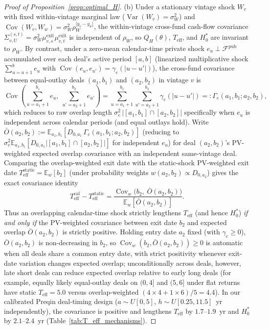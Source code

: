 \begin{proof}[Proof of Proposition~\ref{prop:optimal_H}]
(b) Under a stationary vintage shock $W_v$ with fixed within-vintage marginal law ($\operatorname{Var}(W_v) = \sigma_W^2$) and $\operatorname{Cov}(W_v, W_w) = \sigma_W^2 \rho_W^{|y_v-y_w|}$, the within-vintage cross-fund cash-flow covariance $\Sigma_{v,U}^{(s,t)} = \sigma_W^2 \mu_{v,s}^{\mathrm{exit}}\mu_{v,t}^{\mathrm{exit}}$ is independent of $\rho_W$, so $Q_H(\theta)$, $T_{\mathrm{eff}}$, and $H_0^\ast$ are invariant to $\rho_W$.
By contrast, under a zero-mean calendar-time private shock $e_u \perp \mathcal{F}^{\mathrm{pub}}$ accumulated over each deal's active period $[a,b]$ (linearized multiplicative shock $\sum_{u=a+1}^b e_u$ with $\operatorname{Cov}(e_u,e_{u'}) = \gamma_e(|u-u'|)$), the cross-fund covariance between equal-outlay deals $(a_1,b_1)$ and $(a_2,b_2)$ in vintage $v$ is
\[
\operatorname{Cov}\!\left(\sum_{u=a_1+1}^{b_1} e_u,\;\sum_{u'=a_2+1}^{b_2} e_{u'}\right)
= \sum_{u=a_1+1}^{b_1}\sum_{u'=a_2+1}^{b_2} \gamma_e(|u-u'|) =: \Gamma_e(a_1,b_1; a_2,b_2),
\]
which reduces to raw overlap length $\sigma_e^2\,|[a_1,b_1]\cap[a_2,b_2]|$ specifically when $e_u$ is independent across calendar periods (and equal outlays hold).
Write $\bar{O}(a_2, b_2) := \mathbb{E}_{a_1,b_1}[D_{0,a_1}\,\Gamma_e(a_1,b_1;a_2,b_2)]$ (reducing to $\sigma_e^2\mathbb{E}_{a_1,b_1}[D_{0,a_1}|[a_1,b_1]\cap[a_2,b_2]|]$ for independent $e_u$) for deal $(a_2,b_2)$'s PV-weighted expected overlap covariance with an independent same-vintage deal. Comparing the overlap-weighted exit date with the static-shock PV-weighted exit date $T_{\mathrm{eff}}^{\mathrm{static}} = \mathbb{E}_w[b_2]$ (under probability weights $w(a_2,b_2) \propto D_{0,a_2}$) gives the exact covariance identity
\[
T_{\mathrm{eff}}^{\mathrm{cal}} - T_{\mathrm{eff}}^{\mathrm{static}}
= \frac{\operatorname{Cov}_w\!\bigl(b_2,\;\bar{O}(a_2,b_2)\bigr)}{\mathbb{E}_w[\bar{O}(a_2,b_2)]}.
\]
Thus an overlapping calendar-time shock strictly lengthens $T_{\mathrm{eff}}$ (and hence $H_0^\ast$) \emph{if and only if} the PV-weighted covariance between exit date $b_2$ and expected overlap $\bar{O}(a_2,b_2)$ is strictly positive. Holding entry date $a_2$ fixed (with $\gamma_e \ge 0$), $\bar{O}(a_2,b_2)$ is non-decreasing in $b_2$, so $\operatorname{Cov}_w(b_2, \bar{O}(a_2,b_2)) \ge 0$ is automatic when all deals share a common entry date, with strict positivity whenever exit-date variation changes expected overlap; unconditionally across deals, however, late short deals can reduce expected overlap relative to early long deals (for example, equally likely equal-outlay deals on $(0,4]$ and $(5,6]$ under flat returns have static $T_{\mathrm{eff}} = 5.0$ versus overlap-weighted $(4\times 4 + 1\times 6)/5 = 4.4$). In our calibrated Preqin deal-timing design ($a \sim U[0,5]$, $h \sim U[0.25,11.5]$~yr independently), the covariance is positive and lengthens $T_{\mathrm{eff}}$ by $1.7\text{--}1.9$~yr and $H_0^\ast$ by $2.1\text{--}2.4$~yr (Table~\ref{tab:T_eff_mechanisms}).


\end{proof}
